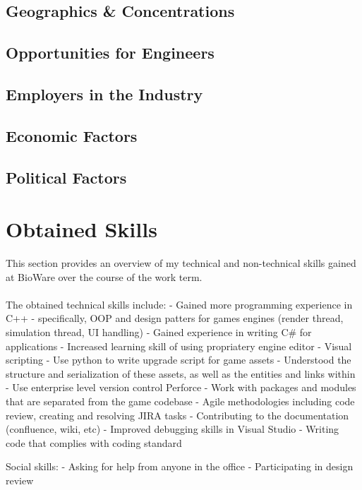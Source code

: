 \documentclass[10pt,letterpaper]{article}
\begin{document}
\subsection{Geographics \& Concentrations}

\subsection{Opportunities for Engineers}

\subsection{Employers in the Industry}

\subsection{Economic Factors}

\subsection{Political Factors}

\section{Obtained Skills}\label{obtained-skills}

This section provides an overview of my technical and non-technical skills gained at BioWare over the course of the work term. \\
\\

The obtained technical skills include:
- Gained more programming experience in C++
- specifically, OOP and design patters for games engines (render thread, simulation thread, UI handling)
- Gained experience in writing C\# for applications
- Increased learning skill of using propriatery engine editor
- Visual scripting
- Use python to write upgrade script for game assets
- Understood the structure and serialization of these assets, as well as the entities and links within
- Use enterprise level version control Perforce
- Work with packages and modules that are separated from the game codebase
- Agile methodologies including code review, creating and resolving JIRA tasks
- Contributing to the documentation (confluence, wiki, etc)
- Improved debugging skills in Visual Studio
- Writing code that complies with coding standard

Social skills:
- Asking for help from anyone in the office
- Participating in design review
\end{document}
